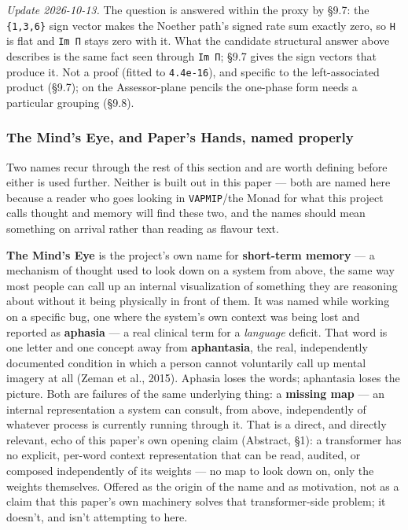 \documentclass[
  10pt,
]{article}
\begin{document}
\emph{Update 2026-10-13.} The question is answered within the proxy by
§9.7: the \texttt{\{1,3,6\}} sign vector makes the Noether path's signed
rate sum exactly zero, so \texttt{H} is flat and \texttt{Im\ Π} stays
zero with it. What the candidate structural answer above describes is
the same fact seen through \texttt{Im\ Π}; §9.7 gives the sign vectors
that produce it. Not a proof (fitted to \texttt{4.4e-16}), and specific
to the left-associated product (§9.7); on the Assessor-plane pencils the
one-phase form needs a particular grouping (§9.8).

\hypertarget{the-minds-eye-and-papers-hands-named-properly}{%
\subsubsection{The Mind's Eye, and Paper's Hands, named
properly}\label{the-minds-eye-and-papers-hands-named-properly}}

Two names recur through the rest of this section and are worth defining
before either is used further. Neither is built out in this paper ---
both are named here because a reader who goes looking in
\texttt{VAPMIP}/the Monad for what this project calls thought and memory
will find these two, and the names should mean something on arrival
rather than reading as flavour text.

\textbf{The Mind's Eye} is the project's own name for \textbf{short-term
memory} --- a mechanism of thought used to look down on a system from
above, the same way most people can call up an internal visualization of
something they are reasoning about without it being physically in front
of them. It was named while working on a specific bug, one where the
system's own context was being lost and reported as \textbf{aphasia} ---
a real clinical term for a \emph{language} deficit. That word is one
letter and one concept away from \textbf{aphantasia}, the real,
independently documented condition in which a person cannot voluntarily
call up mental imagery at all (Zeman et al., 2015). Aphasia loses the
words; aphantasia loses the picture. Both are failures of the same
underlying thing: a \textbf{missing map} --- an internal representation
a system can consult, from above, independently of whatever process is
currently running through it. That is a direct, and directly relevant,
echo of this paper's own opening claim (Abstract, §1): a transformer has
no explicit, per-word context representation that can be read, audited,
or composed independently of its weights --- no map to look down on,
only the weights themselves. Offered as the origin of the name and as
motivation, not as a claim that this paper's own machinery solves that
transformer-side problem; it doesn't, and isn't attempting to here.
\end{document}
